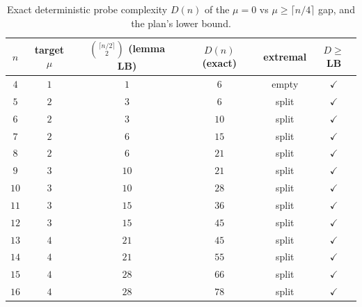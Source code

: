 \begin{table}[t]\centering\small
\begin{tabular}{@{}cccccc@{}}
\toprule
$n$ & target $\mu$ & $\binom{\lceil n/2\rceil}{2}$ (lemma LB) & $D(n)$ (exact) & extremal & $D\ge$LB \\
\midrule
$4$ & $1$ & $1$ & $6$ & \textsf{empty} & $\checkmark$ \\
$5$ & $2$ & $3$ & $6$ & \textsf{split} & $\checkmark$ \\
$6$ & $2$ & $3$ & $10$ & \textsf{split} & $\checkmark$ \\
$7$ & $2$ & $6$ & $15$ & \textsf{split} & $\checkmark$ \\
$8$ & $2$ & $6$ & $21$ & \textsf{split} & $\checkmark$ \\
$9$ & $3$ & $10$ & $21$ & \textsf{split} & $\checkmark$ \\
$10$ & $3$ & $10$ & $28$ & \textsf{split} & $\checkmark$ \\
$11$ & $3$ & $15$ & $36$ & \textsf{split} & $\checkmark$ \\
$12$ & $3$ & $15$ & $45$ & \textsf{split} & $\checkmark$ \\
$13$ & $4$ & $21$ & $45$ & \textsf{split} & $\checkmark$ \\
$14$ & $4$ & $21$ & $55$ & \textsf{split} & $\checkmark$ \\
$15$ & $4$ & $28$ & $66$ & \textsf{split} & $\checkmark$ \\
$16$ & $4$ & $28$ & $78$ & \textsf{split} & $\checkmark$ \\
\bottomrule
\end{tabular}
\caption{Exact deterministic probe complexity $D(n)$ of the $\mu{=}0$ vs $\mu{\ge}\lceil n/4\rceil$ gap, and the plan's lower bound.}
\label{tab:detcomplexity}
\end{table}
